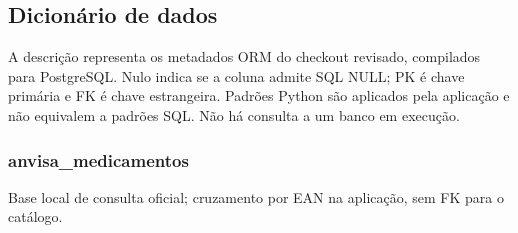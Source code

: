\begingroup{}
\subsection{Dicionário de dados}\label{sec:dicionario}
A descrição representa os metadados ORM do checkout revisado, compilados para PostgreSQL. Nulo indica se a coluna admite SQL NULL; PK é chave primária e FK é chave estrangeira. Padrões Python são aplicados pela aplicação e não equivalem a padrões SQL. Não há consulta a um banco em execução.
\subsubsection{anvisa\_medicamentos}\label{dic:anvisa_medicamentos}
Base local de consulta oficial; cruzamento por EAN na aplicação, sem FK para o catálogo.
\begingroup\footnotesize\setlength{\tabcolsep}{3pt}
